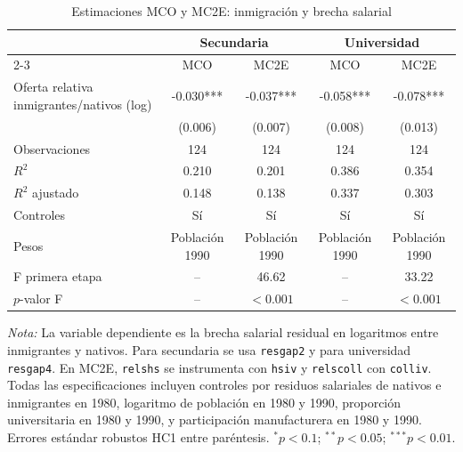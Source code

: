 \begin{table}[H]
\centering
\caption{Estimaciones MCO y MC2E: inmigración y brecha salarial}
\begin{tabular}{lcccc}
\hline\hline
 & \multicolumn{2}{c}{Secundaria} & \multicolumn{2}{c}{Universidad} \\
\cline{2-3} \cline{4-5}
 & MCO & MC2E & MCO & MC2E \\
\hline
Oferta relativa inmigrantes/nativos (log) & -0.030*** & -0.037*** & -0.058*** & -0.078*** \\
 & (0.006) & (0.007) & (0.008) & (0.013) \\
\hline
Observaciones & 124 & 124 & 124 & 124 \\
$R^{2}$ & 0.210 & 0.201 & 0.386 & 0.354 \\
$R^{2}$ ajustado & 0.148 & 0.138 & 0.337 & 0.303 \\
Controles & Sí & Sí & Sí & Sí \\
Pesos & Población 1990 & Población 1990 & Población 1990 & Población 1990 \\
F primera etapa & -- & 46.62 & -- & 33.22 \\
$p$-valor F & -- & $<0.001$ & -- & $<0.001$ \\
\hline\hline
\end{tabular}

\vspace{0.3em}

\parbox{0.95\textwidth}{\footnotesize
\textit{Nota:} La variable dependiente es la brecha salarial residual en logaritmos entre inmigrantes y nativos. Para secundaria se usa \texttt{resgap2} y para universidad \texttt{resgap4}. En MC2E, \texttt{relshs} se instrumenta con \texttt{hsiv} y \texttt{relscoll} con \texttt{colliv}. Todas las especificaciones incluyen controles por residuos salariales de nativos e inmigrantes en 1980, logaritmo de población en 1980 y 1990, proporción universitaria en 1980 y 1990, y participación manufacturera en 1980 y 1990. Errores estándar robustos HC1 entre paréntesis. $^{*}p<0.1$; $^{**}p<0.05$; $^{***}p<0.01$.
}
\end{table}
